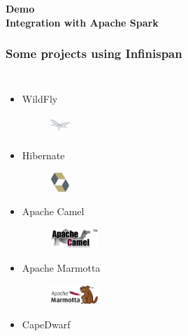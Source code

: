 \documentclass[10pt,utf8]{beamer}
\begin{document}
\begin{frame}
	\centering
	\huge{\textbf{Demo}} \\
	\vspace{1cm}
	\huge{\textbf{Integration with Apache Spark}}
\end{frame}

\begin{frame}
	\frametitle{Some projects using Infinispan}
	\begin{columns}
		\begin{itemize}
			\item WildFly
				\hspace{10cm}
				\begin{figure}
					\vspace{-1cm}
					\includegraphics[height=0.75cm]{./img/wildfly.eps}
				\end{figure}
			\item Hibernate
				\hspace{10cm}
				\begin{figure}
					\vspace{-1cm}
					\includegraphics[height=0.75cm]{./img/hibernate.eps}
				\end{figure}
			\item Apache Camel
				\hspace{10cm}
				\begin{figure}
					\vspace{-1cm}
					\includegraphics[height=0.75cm]{./img/apache-camel.eps}
				\end{figure}
			\item Apache Marmotta
				\hspace{10cm}
				\begin{figure}
					\vspace{-1cm}
					\includegraphics[height=0.75cm]{./img/marmotta.eps}
				\end{figure}
			\item CapeDwarf

\end{itemize}
\end{columns}
\end{frame}
\end{document}
